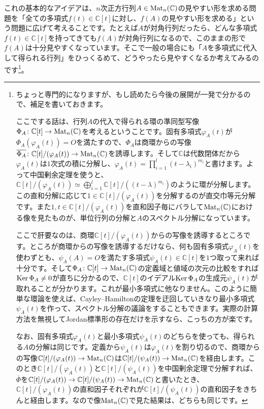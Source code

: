 これの基本的なアイデアは、$n$次正方行列$A \in \operatorname{Mat}_n(\mathbb{C})$の見やすい形を求める問題を「全ての多項式$f(t) \in \mathbb{C}[t]$に対し、$f(A)$の見やすい形を求める」という問題に広げて考えることです。たとえば$A$が対角行列だったら、どんな多項式$f(t) \in \mathbb{C}[t]$を持ってきても$f(A)$が対角行列になるので、このままの形で$f(A)$は十分見やすくなっています。そこで一般の場合にも「$A$を多項式に代入して得られる行列」をひっくるめて、どうやったら見やすくなるか考えてみるのです\footnote{ちょっと専門的になりますが、もし読めたら今後の展開が一発で分かるので、補足を書いておきます。

ここでする話は、行列$A$の代入で得られる環の準同型写像$\Phi_A\colon \mathbb{C}[t] \rightarrow \operatorname{Mat}_n(\mathbb{C})$を考えるということです。固有多項式$\varphi_A(t)$が$\Phi_A(\varphi_A(t)) = O$を満たすので、$\Phi_A$は商環からの写像$\overline{\Phi_A}\colon \mathbb{C}[t]/(\varphi_A(t)) \rightarrow \operatorname{Mat}_n(\mathbb{C})$を誘導します。そして$\mathbb{C}$は代数閉体だから$\varphi_A(t)$は$1$次式の積に分解し、$\varphi_A(t) = \prod_{i = 1}^l (t - \lambda_i)^{m_i}$と書けます。よって中国剰余定理を使うと、$\mathbb{C}[t]/(\varphi_A(t)) \simeq \bigoplus_{i = 1}^l \mathbb{C}[t]/((t - \lambda)^{m_i})$のように環が分解します。この直和分解に応じて$1 \in \mathbb{C}[t]/(\varphi_A(t))$を分解するのが直交巾等元分解です。また$1, t \in \mathbb{C}[t]/(\varphi_A(t))$を直和因子毎にバラして$\operatorname{Mat}_n(\mathbb{C})$における像を見たものが、単位行列の分解と$A$のスペクトル分解になっています。

ここで肝要なのは、商環$\mathbb{C}[t]/(\varphi_A(t))$からの写像を誘導するところです。ところが商環からの写像を誘導するだけなら、何も固有多項式$\varphi_A(t)$を使わずとも、$\psi_A(A) = O$を満たす多項式$\psi_A(t) \in \mathbb{C}[t]$を$1$つ取って来れば十分です。そして$\Phi_A \colon \mathbb{C}[t] \rightarrow \operatorname{Mat}_n(\mathbb{C})$の定義域と値域の次元の比較をすれば$\operatorname{Ker} \Phi_A \neq 0$が直ちに分かるので、$\mathbb{C}[t]$のイデアル$\operatorname{Ker} \Phi_A$の生成元$\psi_A(t)$が取れることが分かります。これが最小多項式に他なりません。このように簡単な環論を使えば、Cayley--Hamiltonの定理を迂回していきなり最小多項式$\psi_A(t)$を作って、スペクトル分解の議論をすることもできます。実際の計算方法を無視してJordan標準形の存在だけを示すなら、こっちの方が楽です。

なお、固有多項式$\varphi_A(t)$と最小多項式$\psi_A(t)$のどちらを使っても、得られる$A$の分解は同じです。定義から$\psi_A(t)$は$\varphi_A(t)$を割り切るので、商環からの写像$\mathbb{C}[t]/(\varphi_A(t)) \rightarrow \operatorname{Mat}_n(\mathbb{C})$は$\mathbb{C}[t]/(\psi_A(t)) \rightarrow \operatorname{Mat}_n(\mathbb{C})$を経由します。このとき$\mathbb{C}[t]/(\varphi_A(t))$と$\mathbb{C}[t]/(\psi_A(t))$を中国剰余定理で分解すれば、$\overline{\Phi}$を$\mathbb{C}[t]/(\varphi_A(t)) \rightarrow \mathbb{C}[t]/(\psi_A(t)) \rightarrow \operatorname{Mat}_n(\mathbb{C})$と書いたとき、$\mathbb{C}[t]/(\varphi_A(t))$の直和因子それぞれが$\mathbb{C}[t]/(\psi_A(t))$の直和因子をきちんと経由します。なので像$\operatorname{Mat}_n(\mathbb{C})$で見た結果は、どちらも同じです。
}。

